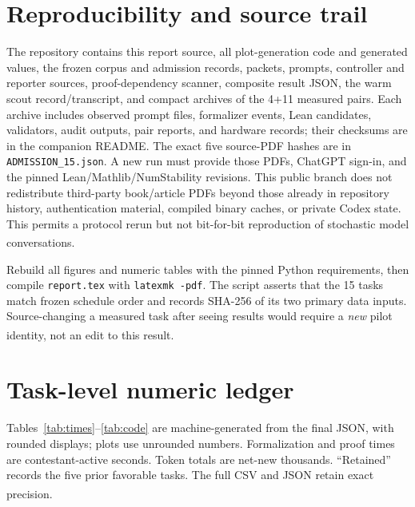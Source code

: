 \documentclass[10pt,a4paper]{article}
\newcommand{\src}[1]{\textsuperscript{\cite{#1}}}
\begin{document}
\section{Reproducibility and source trail}

The repository contains this report source, all plot-generation code and
generated values, the frozen corpus and admission records, packets, prompts,
controller and reporter sources, proof-dependency scanner, composite result
JSON, the warm scout record/transcript, and compact archives of the 4+11
measured pairs. Each archive includes observed prompt files, formalizer
events, Lean candidates, validators, audit outputs, pair reports, and
hardware records; their checksums are in the companion README. The exact
five source-PDF hashes are in \texttt{ADMISSION\_15.json}. A new run must
provide those PDFs, ChatGPT sign-in, and the pinned Lean/Mathlib/NumStability
revisions. This public branch does not redistribute third-party book/article
PDFs beyond those already in repository history, authentication material,
compiled binary caches, or private Codex state. This permits a protocol
rerun but not bit-for-bit reproduction of stochastic model conversations.
\src{readme,admission33,evidencearchives,libsnapshot,runtimesnapshot}

Rebuild all figures and numeric tables with the pinned Python requirements,
then compile \texttt{report.tex} with \texttt{latexmk -pdf}. The script
asserts that the 15 tasks match frozen schedule order and records SHA-256
of its two primary data inputs. Source-changing a measured task after seeing
results would require a \emph{new} pilot identity, not an edit to this
result.\src{plotcode,readme,corpus33,results35}

\appendix
\section{Task-level numeric ledger}

Tables~\ref{tab:times}--\ref{tab:code} are machine-generated from the final
JSON, with rounded displays; plots use unrounded numbers. Formalization and
proof times are contestant-active seconds. Token totals are net-new
thousands. ``Retained'' records the five prior favorable tasks. The full CSV
and JSON retain exact precision.\src{results35,plotcode}
\end{document}
